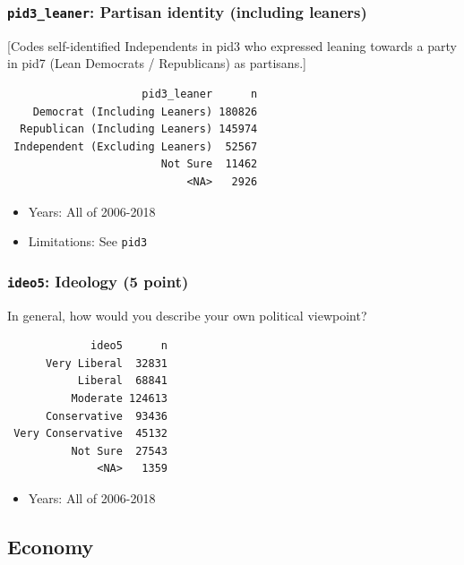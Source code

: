 \documentclass[10pt,article,oneside]{memoir}
\theoremstyle{definition}
\begin{document}
\hypertarget{pid3_leaner-partisan-identity-including-leaners}{%
\subsubsection{\texorpdfstring{\texttt{pid3\_leaner}: Partisan identity
(including
leaners)}{pid3\_leaner: Partisan identity (including leaners)}}\label{pid3_leaner-partisan-identity-including-leaners}}

{[}Codes self-identified Independents in pid3 who expressed leaning
towards a party in pid7 (Lean Democrats / Republicans) as partisans.{]}

\begin{verbatim}
                     pid3_leaner      n
    Democrat (Including Leaners) 180826
  Republican (Including Leaners) 145974
 Independent (Excluding Leaners)  52567
                        Not Sure  11462
                            <NA>   2926
\end{verbatim}

\begin{itemize}
\tightlist
\item
  Years: All of 2006-2018
\item
  Limitations: See \texttt{pid3}
\end{itemize}

\hypertarget{ideo5-ideology-5-point}{%
\subsubsection{\texorpdfstring{\texttt{ideo5}: Ideology (5
point)}{ideo5: Ideology (5 point)}}\label{ideo5-ideology-5-point}}

In general, how would you describe your own political viewpoint?

\begin{verbatim}
             ideo5      n
      Very Liberal  32831
           Liberal  68841
          Moderate 124613
      Conservative  93436
 Very Conservative  45132
          Not Sure  27543
              <NA>   1359
\end{verbatim}

\begin{itemize}
\tightlist
\item
  Years: All of 2006-2018
\end{itemize}

\hypertarget{economy}{%
\subsection{Economy}\label{economy}}
\end{document}
